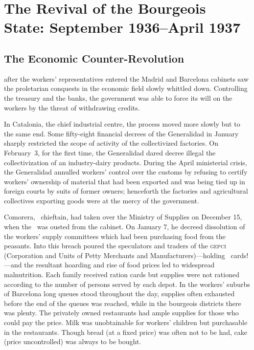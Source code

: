 \chapter[The Revival of the Bourgeois State]{The Revival of the Bourgeois State: September 1936--April 1937}

\section{The Economic Counter-Revolution}

 after the workers’ representatives entered the Madrid and Barcelona cabinets saw the proletarian conquests in the economic field slowly whittled down. Controlling the treasury and the banks, the government was able to force its will on the workers by the threat of withdrawing credits.

In Catalonia, the chief industrial centre, the process moved more slowly but to the same end. Some fifty-eight financial decrees of the Generalidad in January sharply restricted the scope of activity of the collectivized factories. On February~3, for the first time, the Generalidad dared decree illegal the collectivization of an industry-dairy products. During the April ministerial crisis, the Generalidad annulled workers’ control over the customs by refusing to certify workers’ ownership of material that had been exported and was being tied up in foreign courts by suits of former owners; henceforth the factories and agricultural collectives exporting goods were at the mercy of the government.

Comorera, \PSUC\ chieftain, had taken over the Ministry of Supplies on December 15, when the \POUM\ was ousted from the cabinet. On January 7, he decreed dissolution of the workers’ supply committees which had been purchasing food from the peasants. Into this breach poured the speculators and traders of the \textsc{gepci} (Corporation and Units of Petty Merchants and Manufacturers)---holding \UGT\ cards!---and the resultant hoarding and rise of food prices led to widespread malnutrition. Each family received ration cards but supplies were not rationed according to the number of persons served by each depot. In the workers’ suburbs of Barcelona long queues stood throughout the day, supplies often exhausted before the end of the queues was reached, while in the bourgeois districts there was plenty. The privately owned restaurants had ample supplies for those who could pay the price. Milk was unobtainable for workers’ children but purchasable in the restaurants. Though bread (at a fixed price) was often not to be had, cake (price uncontrolled) was always to be bought.

